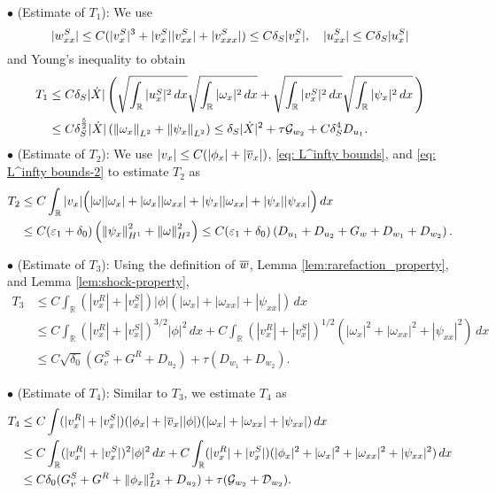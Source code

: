 \documentclass[11pt,reqno]{amsart}
\begin{document}
\begin{appendix}
\noindent $\bullet$ (Estimate of $T_1$): We use 
\[|w^S_{xx}| \le C (|v^S_x|^3 + |v^S_x||v^S_{xx}| + |v^S_{xxx}|) \le C \delta_S |v^S_x|, \quad |u^S_{xx}| \le C \delta_S |u^S_x|\]
and Young's inequality to obtain
\begin{align*}
T_1
&\le C \delta_S |\dot{X}| \left( \sqrt{\int_\mathbb{R} |u^S_x|^2 \, dx} \sqrt{\int_\mathbb{R} |\omega_x|^2 \, dx } + \sqrt{\int_\mathbb{R} |v^S_x|^2 \, dx} \sqrt{\int_\mathbb{R} |\psi_x|^2 \, dx } \, \right) \\ 
&\le C \delta_S^{\frac{5}{2}} |\dot{X}| \left( \left\lVert\omega_x\right\rVert_{L^2} + \left\lVert\psi_x\right\rVert_{L^2} \right) \le \delta_S |\dot{X}|^2 + \tau \mathcal{G}_{w_2} + C \delta_S^4 D_{u_1}.
\end{align*}
\noindent $\bullet$ (Estimate of $T_2$):  We use $|v_x| \le C (|\phi_x| + |\overline{v}_x|)$, \eqref{eq: L^infty bounds}, and \eqref{eq: L^infty bounds-2} to estimate $T_2$ as
\begin{align*}
T_2 &\le C \int_{\mathbb{R}} |v_x| \Big(|\omega| |\omega_x| + |\omega_x| |\omega_{xx}| +|\psi_x||\omega_{xx}| + |\psi_x| |\psi_{xx}| \Big)\, dx \\
&\le C(\varepsilon_1 +\delta_0) \left( \left\lVert\psi_x\right\rVert_{H^1}^2 + \left\lVert\omega\right\rVert_{H^2}^2  \right) \le C(\varepsilon_1 +\delta_0) \left( D_{u_1} + D_{u_2} +G_w  +D_{w_1}+D_{w_2}\right).
\end{align*}

\noindent $\bullet$ (Estimate of $T_3$): Using the definition of $\overline{w}$, Lemma \ref{lem:rarefaction_property}, and Lemma \ref{lem:shock-property},
\begin{align*}
T_3 &\le C \int_\mathbb{R}  (|v^R_x|+|v^S_x|) |\phi| ( |\omega_x| + |\omega_{xx}| + |\psi_{xx}| ) \, dx \\ 
&\le C  \int_{\mathbb{R}} (|v^R_x|+|v^S_x|)^{3/2}|\phi|^2 \, dx + C\int_\mathbb{R} (|v^R_x|+|v^S_x|)^{1/2} (|\omega_x|^2 +|\omega_{xx}|^2 + |\psi_{xx}|^2 ) \, dx \\ 
&\le C \sqrt{\delta_0} \left( G^S_v + G^R + D_{u_2} \right) + \tau (D_{w_1}+D_{w_2}).
\end{align*}

\noindent $\bullet$ (Estimate of $T_4$): Similar to $T_3$, we estimate $T_4$ as
\begin{align*}
T_4 &\le C \int (|v^R_x|+|v^S_x|) (|\phi_x|+|\overline{v}_x||\phi|) (|\omega_x| + |\omega_{xx}| + |\psi_{xx}|) \, dx \\ 
& \le C \int_\mathbb{R} (|v^R_x|+|v^S_x|)^2 |\phi|^2 \, dx + C \int_\mathbb{R} (|v^R_x|+|v^S_x|) (|\phi_x|^2 + |\omega_x|^2 +|\omega_{xx}|^2 + |\psi_{xx}|^2) \,dx \\ 
&\le C \delta_0 (G^S_v +G^R + \|\phi_x\|_{L^2}^2 + D_{u_2}) + \tau (\mathcal{G}_{w_2} +\mathcal{D}_{w_2}). 
\end{align*}


\end{appendix}
\end{document}
